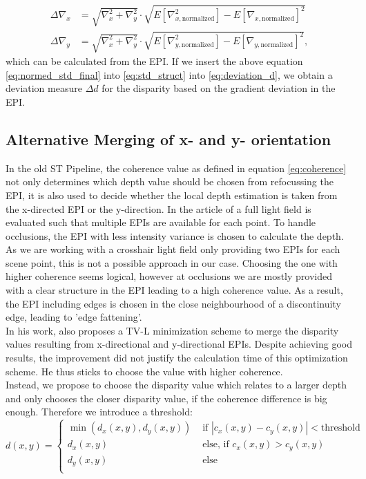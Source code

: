 \documentclass  [
  paper    = a4,
  BCOR     = 10mm,
  twoside,
  fontsize = 12pt,
  fleqn,
  toc      = bibnumbered,
  toc      = listofnumbered,
  numbers  = noendperiod,
  headings = normal,
  listof   = leveldown,
  version  = 3.03
]                                       {scrreprt}
\begin{document}
 \begin{align}\label{eq:normed_std_final}
 \Delta\nabla_{x} &=  \sqrt{\nabla_x^2 + \nabla_y^2} \cdot \sqrt{E[\nabla_{x, \text{normalized}}^2] - E[\nabla_{x, \text{normalized}}]^2}\\
 \Delta\nabla_{y} &= \sqrt{\nabla_x^2 + \nabla_y^2} \cdot \sqrt{E[\nabla_{y, \text{normalized}}^2] - E[\nabla_{y, \text{normalized}}]^2},
 \end{align}
 which can be calculated from the EPI.
 If we insert the above equation \ref{eq:normed_std_final} into \ref{eq:std_struct} into \ref{eq:deviation_d}, we obtain a deviation measure $\Delta d$ for the disparity based on the gradient deviation in the EPI.
 
 \subsection{Alternative Merging of x- and y- orientation}
 In the old ST Pipeline, the coherence value as defined in equation \ref{eq:coherence} not only determines which depth value should be chosen from refocussing the EPI, it is also used to decide whether the local depth estimation is taken from the x-directed EPI or the y-direction. In the article of \cite{sheng2018occlusion} a full light field is evaluated such that multiple EPIs are available for each point. To handle occlusions, the EPI with less intensity variance is chosen to calculate the depth. As we are working with a crosshair light field only providing two EPIs for each scene point, this is not a possible approach in our case. Choosing the one with higher coherence seems logical, however at occlusions we are mostly provided with a clear structure in the EPI leading to a high coherence value. As a result, the EPI including edges is chosen in the close neighbourhood of a discontinuity edge, leading to 'edge fattening'.\\
 In his work, \cite{wanner2014orientation} also proposes a TV-L minimization scheme to merge the disparity values resulting from x-directional and y-directional EPIs. Despite achieving good results, the improvement did not justify the calculation time of this optimization scheme. He thus sticks to choose the value with higher coherence.\\
 Instead, we propose to choose the disparity value which relates to a larger depth and only chooses the closer disparity value, if the coherence difference is big enough. Therefore we introduce a threshold:
 \begin{equation}\label{eq:altmerging}
 d(x,y) = \begin{cases}
 \min(d_x(x,y),d_y(x,y))&\text{ if } |c_x(x,y)-c_y(x,y)|<\text{threshold} \\
  d_x(x,y)&\text{ else, if } c_x(x,y)> c_y(x,y)\\
  d_y(x,y)&\text{ else}\\
  \end{cases}
   \end{equation}
\end{document}
